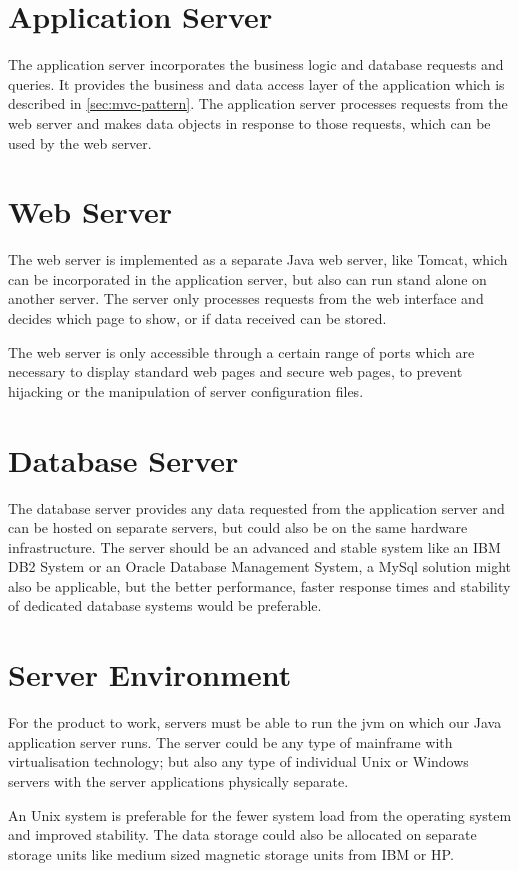 \documentclass[11pt,a4paper,oneside,svgnames]{report}
\begin{document}
\section{Application Server}
The application server incorporates the business logic and database requests and queries. It provides the business and data access layer of the application which is described in \ref{sec:mvc-pattern}. The application server processes requests from the web server and makes data objects in response to those requests, which can be used by the web server.

\section{Web Server}
The web server is implemented as a separate Java web server, like Tomcat, which can be incorporated in the application server, but also can run stand alone on another server. The server only processes requests from the web interface and decides which page to show, or if data received can be stored.

The web server is only accessible through a certain range of ports which are necessary to display standard web pages and secure web pages, to prevent hijacking or the manipulation of server configuration files.

\section{Database Server}
The database server provides any data requested from the application server and can be hosted on separate servers, but could also be on the same hardware infrastructure. The server should be an advanced and stable system like an IBM DB2 System or an Oracle Database Management System, a MySql solution might also be applicable, but the better performance, faster response times and stability of dedicated database systems would be preferable.

\section{Server Environment}
For the product to work, servers must be able to run the \gls{jvm} on which our Java application server runs. The server could be any type of mainframe with virtualisation technology; but also any type of individual Unix or Windows servers with the server applications physically separate.

An Unix system is preferable for the fewer system load from the operating system and improved stability. The data storage could also be allocated on separate storage units like medium sized magnetic storage units from IBM or HP.
\end{document}
